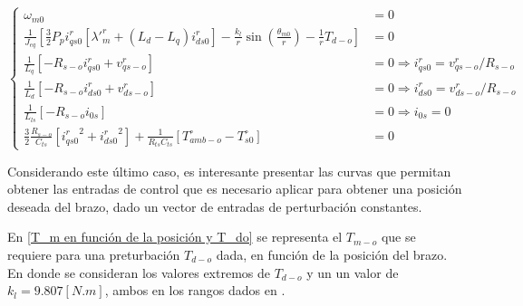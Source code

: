 \documentclass[a4paper, 10pt, onecolumn,journal]{ieeeconf}
\begin{document}
\begin{equation}
    \begin{cases}
        \omega_{m0} &= 0\\
        \frac{1}{J_{eq}}\left[\frac{3}{2} P_p i^r_{qs0}\left[\lambda'^r_m + (L_d - L_q) i^r_{ds0} \right] - \frac{k_l}{r}\sin\left(\frac{\theta_{m0}}{r}\right) - \frac{1}{r}T_{d-o}\right] &= 0\\
        \frac{1}{L_q}\left[-R_{s-o} i^r_{qs0} + v^r_{qs-o}\right] &= 0 \Rightarrow i^r_{qs0} = v^r_{qs-o}/R_{s-o}\\ 
        \frac{1}{L_d}\left[-R_{s-o} i^r_{ds0} + v^r_{ds-o}\right] &= 0 \Rightarrow i^r_{ds0} = v^r_{ds-o}/R_{s-o}\\ 
        \frac{1}{L_{ls}}\left[-R_{s-o} i_{0s}\right] &= 0 \Rightarrow i_{0s} = 0\\ 
        \frac{3}{2}\frac{R_{s-o}}{C_{ts}} \left[ {i^r_{qs0}}^2+ {i^r_{ds0}}^2 \right] + \frac{1}{R_{ts}C_{ts}}\left[T^{\circ}_{amb-o} - T_{s0}^{\circ}\right] &= 0
    \end{cases}
    \label{modelo de operacion NL cuasi_estacionario desarrollado reducido}
\end{equation}

Considerando este último caso, es interesante presentar las curvas que permitan obtener las entradas
de control que es necesario aplicar para obtener una posición deseada
del brazo, dado un vector de entradas de perturbación constantes.

En \cref{T_m en función de la posición y T_do} se representa
el $T_{m-o}$ que se requiere para una preturbación $T_{d-o}$ dada,
en función de la posición del brazo. En donde se
consideran los valores extremos de $T_{d-o}$ y un
un valor de $k_l = 9.807 \left[N.m\right]$, ambos en los rangos
dados en \cite{c1}.
\end{document}
